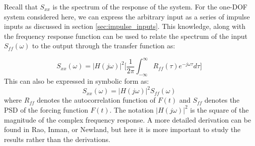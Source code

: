 \documentclass[12pt,letter]{article}
\begin{document}
Recall that $S_{xx}$ is the spectrum of the response of the system. For the one-DOF system considered here, we can express the arbitrary input as a series of impulse inputs as discussed in section \ref{sec:impulse_inputs}. This knowledge, along with the frequency response function can be used to relate the spectrum of the input $S_{ff}(\omega)$ to the output through the transfer function as: 







\begin{equation}
S_{xx}(\omega) =  |H(j\omega)|^2\Bigg[\frac{1}{2 \pi } \int_{-\infty}^{\infty} R_{ff}(\tau) e^{-j \omega \tau}d  \tau  \Bigg] 
\end{equation}
This can also be expressed in symbolic form as:
\begin{equation}
S_{xx}(\omega) =  |H(j\omega)|^2 S_{ff}(\omega)
\end{equation}
where $R_{ff}$ denotes the autocorrelation function of $F(t)$ and $S_{ff}$ denotes the PSD of the forcing function $F(t)$. The notation $|H(j\omega)|^2$ is the square of the magnitude of the complex frequency response. A more detailed derivation can be found in Rao\protect\footnotemark[1], Inman\protect\footnotemark[2], or Newland\protect\footnotemark[3], but here it is more important to study the results rather than the derivations.

\end{document}

